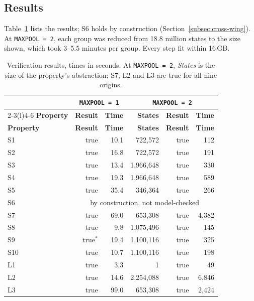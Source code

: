 \subsection{Results}
\label{subsec:results}

Table~\ref{tab:results} lists the results; S6 holds by construction (Section~\ref{subsec:cross-wing}). At \texttt{MAXPOOL = 2}, each group was reduced from 18.8 million states to the size shown, which took 3--5.5 minutes per group. Every step fit within 16\,GB.

\begingroup
\small
\renewcommand{\arraystretch}{1.1}
\begin{longtable}{@{}lrrrrr@{}}
  \caption{Verification results, times in seconds. At \texttt{MAXPOOL = 2}, \emph{States} is the size of the property's abstraction; S7, L2 and L3 are true for all nine origins.}\label{tab:results}\\
  \toprule
  & \multicolumn{2}{c}{\texttt{MAXPOOL = 1}} & \multicolumn{3}{c}{\texttt{MAXPOOL = 2}}\\
  \cmidrule(lr){2-3}\cmidrule(l){4-6}
  \textbf{Property} & \textbf{Result} & \textbf{Time} & \textbf{States} & \textbf{Result} & \textbf{Time}\\
  \midrule
  \endfirsthead
  \toprule
  \textbf{Property} & \textbf{Result} & \textbf{Time} & \textbf{States} & \textbf{Result} & \textbf{Time}\\
  \midrule
  \endhead
  \bottomrule
  \endfoot
  S1 & true & 10.1 & 722,572 & true & 112\\
  S2 & true & 16.8 & 722,572 & true & 191\\
  S3 & true & 13.4 & 1,966,648 & true & 330\\
  S4 & true & 19.3 & 1,966,648 & true & 589\\
  S5 & true & 35.4 & 346,364 & true & 266\\
  S6 & \multicolumn{5}{c}{by construction, not model-checked}\\
  S7 & true & 69.0 & 653,308 & true & 4,382\\
  S8 & true & 9.8 & 1,075,496 & true & 145\\
  S9 & true\(^{*}\) & 19.4 & 1,100,116 & true & 325\\
  S10 & true & 10.7 & 1,100,116 & true & 198\\
  \midrule
  L1 & true & 3.3 & 1 & true & 49\\
  L2 & true & 14.6 & 2,254,088 & true & 6,846\\
  L3 & true & 99.0 & 653,308 & true & 2,424\\

\end{longtable}
